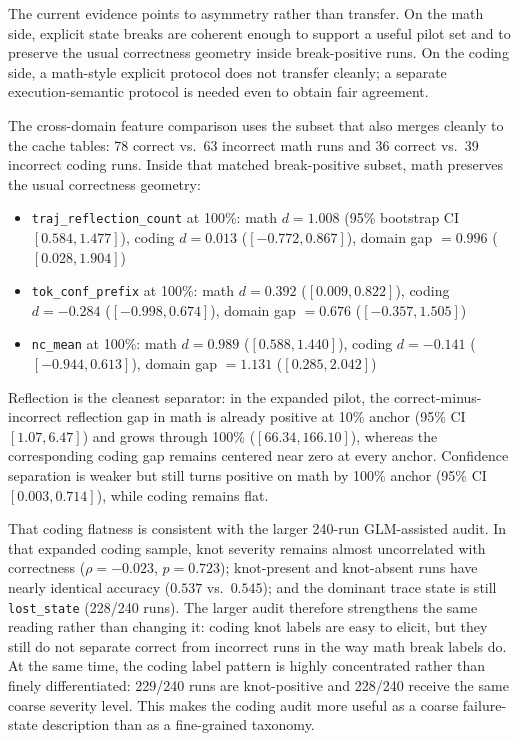 \documentclass[10pt]{article}
\begin{document}
The current evidence points to asymmetry rather than transfer. On the math side, explicit state breaks are coherent enough to support a useful pilot set and to preserve the usual correctness geometry inside break-positive runs. On the coding side, a math-style explicit protocol does not transfer cleanly; a separate execution-semantic protocol is needed even to obtain fair agreement.

The cross-domain feature comparison uses the subset that also merges cleanly to the cache tables: 78 correct vs.\ 63 incorrect math runs and 36 correct vs.\ 39 incorrect coding runs. Inside that matched break-positive subset, math preserves the usual correctness geometry:
\begin{itemize}
    \item \texttt{traj\_reflection\_count} at 100\%: math $d = 1.008$ (95\% bootstrap CI $[0.584, 1.477]$), coding $d = 0.013$ ($[-0.772, 0.867]$), domain gap $= 0.996$ ($[0.028, 1.904]$)
    \item \texttt{tok\_conf\_prefix} at 100\%: math $d = 0.392$ ($[0.009, 0.822]$), coding $d = -0.284$ ($[-0.998, 0.674]$), domain gap $= 0.676$ ($[-0.357, 1.505]$)
    \item \texttt{nc\_mean} at 100\%: math $d = 0.989$ ($[0.588, 1.440]$), coding $d = -0.141$ ($[-0.944, 0.613]$), domain gap $= 1.131$ ($[0.285, 2.042]$)
\end{itemize}
Reflection is the cleanest separator: in the expanded pilot, the correct-minus-incorrect reflection gap in math is already positive at 10\% anchor (95\% CI $[1.07, 6.47]$) and grows through 100\% ($[66.34, 166.10]$), whereas the corresponding coding gap remains centered near zero at every anchor. Confidence separation is weaker but still turns positive on math by 100\% anchor (95\% CI $[0.003, 0.714]$), while coding remains flat.

That coding flatness is consistent with the larger 240-run GLM-assisted audit. In that expanded coding sample, knot severity remains almost uncorrelated with correctness ($\rho=-0.023$, $p=0.723$); knot-present and knot-absent runs have nearly identical accuracy ($0.537$ vs.\ $0.545$); and the dominant trace state is still \texttt{lost\_state} (228/240 runs). The larger audit therefore strengthens the same reading rather than changing it: coding knot labels are easy to elicit, but they still do not separate correct from incorrect runs in the way math break labels do. At the same time, the coding label pattern is highly concentrated rather than finely differentiated: 229/240 runs are knot-positive and 228/240 receive the same coarse severity level. This makes the coding audit more useful as a coarse failure-state description than as a fine-grained taxonomy.
\end{document}
